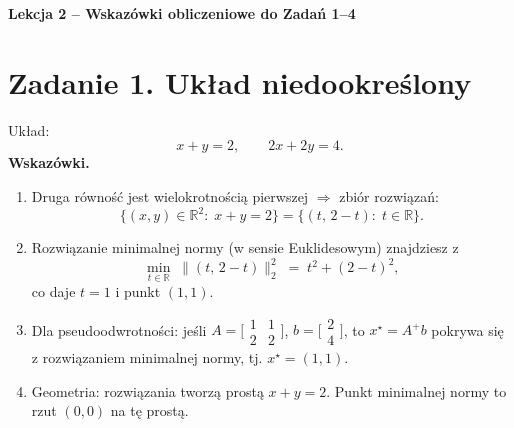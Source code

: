 \documentclass[12pt,a4paper]{article}
\begin{document}
\begin{center}
\Large \textbf{Lekcja 2 – Wskazówki obliczeniowe do Zadań 1–4}
\end{center}

\section*{Zadanie 1. Układ niedookreślony}
Układ:
\[
x+y=2,\qquad 2x+2y=4.
\]
\textbf{Wskazówki.}
\begin{enumerate}
  \item Druga równość jest wielokrotnością pierwszej $\Rightarrow$ zbiór rozwiązań:
  \[
  \{(x,y)\in\mathbb{R}^2:\; x+y=2\}=\{(t,\,2-t):\; t\in\mathbb{R}\}.
  \]
  \item Rozwiązanie minimalnej normy (w sensie Euklidesowym) znajdziesz z
  \[
  \min_{t\in\mathbb{R}} \; \|(t,\,2-t)\|_2^2 \;=\; t^2+(2-t)^2,
  \]
  co daje $t=1$ i punkt $(1,1)$.
  \item Dla pseudoodwrotności: jeśli $A=\bigl[\begin{smallmatrix}1&1\\2&2\end{smallmatrix}\bigr]$, $b=\bigl[\begin{smallmatrix}2\\4\end{smallmatrix}\bigr]$, to $x^\star=A^+b$ pokrywa się z rozwiązaniem minimalnej normy, tj. $x^\star=(1,1)$.
  \item Geometria: rozwiązania tworzą prostą $x+y=2$. Punkt minimalnej normy to rzut $(0,0)$ na tę prostą.
\end{enumerate}
\end{document}
